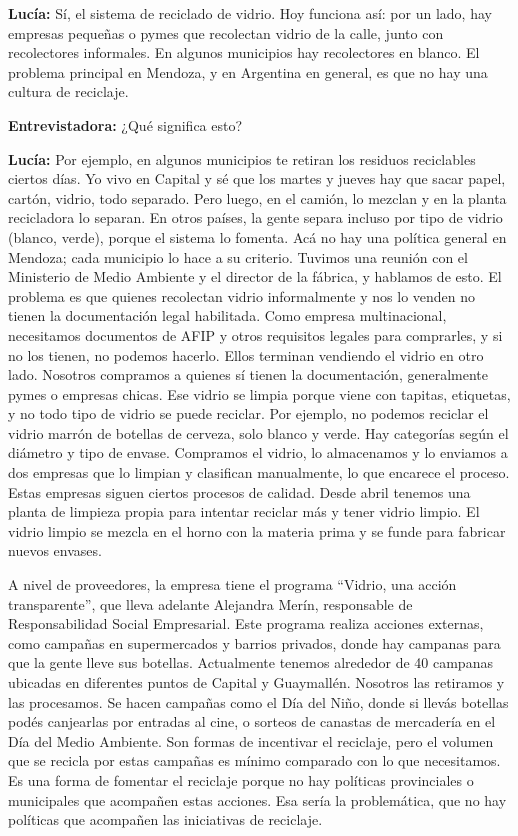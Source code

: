 \textbf{Lucía:} Sí, el sistema de reciclado de vidrio. Hoy funciona así: por un lado, hay empresas pequeñas o pymes que recolectan vidrio de la calle, junto con recolectores informales. En algunos municipios hay recolectores en blanco. El problema principal en Mendoza, y en Argentina en general, es que no hay una cultura de reciclaje. 

\textbf{Entrevistadora:} ¿Qué significa esto?

\textbf{Lucía:} Por ejemplo, en algunos municipios te retiran los residuos reciclables ciertos días. Yo vivo en Capital y sé que los martes y jueves hay que sacar papel, cartón, vidrio, todo separado. Pero luego, en el camión, lo mezclan y en la planta recicladora lo separan. En otros países, la gente separa incluso por tipo de vidrio (blanco, verde), porque el sistema lo fomenta. Acá no hay una política general en Mendoza; cada municipio lo hace a su criterio. Tuvimos una reunión con el Ministerio de Medio Ambiente y el director de la fábrica, y hablamos de esto. El problema es que quienes recolectan vidrio informalmente y nos lo venden no tienen la documentación legal habilitada. Como empresa multinacional, necesitamos documentos de AFIP y otros requisitos legales para comprarles, y si no los tienen, no podemos hacerlo. Ellos terminan vendiendo el vidrio en otro lado. Nosotros compramos a quienes sí tienen la documentación, generalmente pymes o empresas chicas. Ese vidrio se limpia porque viene con tapitas, etiquetas, y no todo tipo de vidrio se puede reciclar. Por ejemplo, no podemos reciclar el vidrio marrón de botellas de cerveza, solo blanco y verde. Hay categorías según el diámetro y tipo de envase. Compramos el vidrio, lo almacenamos y lo enviamos a dos empresas que lo limpian y clasifican manualmente, lo que encarece el proceso. Estas empresas siguen ciertos procesos de calidad. Desde abril tenemos una planta de limpieza propia para intentar reciclar más y tener vidrio limpio. El vidrio limpio se mezcla en el horno con la materia prima y se funde para fabricar nuevos envases. 

A nivel de proveedores, la empresa tiene el programa ``Vidrio, una acción transparente'', que lleva adelante Alejandra Merín, responsable de Responsabilidad Social Empresarial. Este programa realiza acciones externas, como campañas en supermercados y barrios privados, donde hay campanas para que la gente lleve sus botellas. Actualmente tenemos alrededor de 40 campanas ubicadas en diferentes puntos de Capital y Guaymallén. Nosotros las retiramos y las procesamos. Se hacen campañas como el Día del Niño, donde si llevás botellas podés canjearlas por entradas al cine, o sorteos de canastas de mercadería en el Día del Medio Ambiente. Son formas de incentivar el reciclaje, pero el volumen que se recicla por estas campañas es mínimo comparado con lo que necesitamos. Es una forma de fomentar el reciclaje porque no hay políticas provinciales o municipales que acompañen estas acciones. Esa sería la problemática, que no hay políticas que acompañen las iniciativas de reciclaje.

